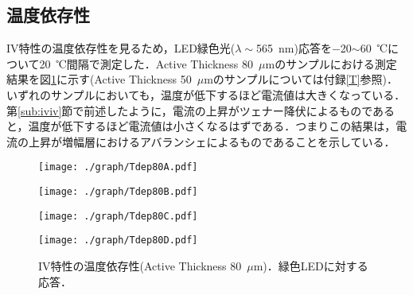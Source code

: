 \subsection{温度依存性}
\label{sub:temp}
IV特性の温度依存性を見るため，LED緑色光($\lambda\sim$565~nm)応答を$-$20$\sim$60~℃について20~℃間隔で測定した．Active Thickness 80~$\mu$mのサンプルにおける測定結果を図\ref{fig:tdep}に示す(Active Thickness 50~$\mu$mのサンプルについては付録\ref{T}参照)．いずれのサンプルにおいても，温度が低下するほど電流値は大きくなっている．第\ref{sub:iviv}節で前述したように，電流の上昇がツェナー降伏によるものであると，温度が低下するほど電流値は小さくなるはずである．つまりこの結果は，電流の上昇が増幅層におけるアバランシェによるものであることを示している．
\begin{figure}[H]
\begin{minipage}{0.5\hsize}
	\centering
	\texttt{[image: ./graph/Tdep80A.pdf]}
\end{minipage}
\begin{minipage}{0.5\hsize}
	\centering
	\texttt{[image: ./graph/Tdep80B.pdf]}
\end{minipage}
\begin{minipage}{0.5\hsize}
	\centering
	\texttt{[image: ./graph/Tdep80C.pdf]}
\end{minipage}
\begin{minipage}{0.5\hsize}
	\centering
	\texttt{[image: ./graph/Tdep80D.pdf]}
\end{minipage}
 	\caption{IV特性の温度依存性(Active Thickness 80~$\mu$m)．緑色LEDに対する応答．}
	\label{fig:tdep}
\end{figure}
\newpage
